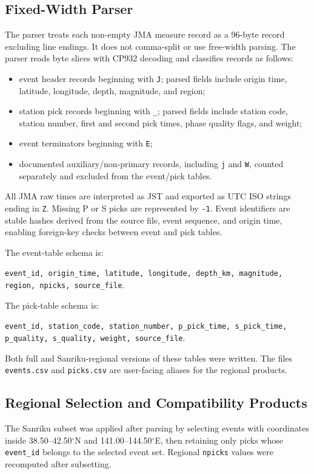 \documentclass[11pt]{article}
\begin{document}
\subsection{Fixed-Width Parser}

The parser treats each non-empty JMA measure record as a 96-byte record excluding line endings.  It does not comma-split or use free-width parsing.  The parser reads byte slices with CP932 decoding and classifies records as follows:
\begin{itemize}
  \item event header records beginning with \texttt{J}; parsed fields include origin time, latitude, longitude, depth, magnitude, and region;
  \item station pick records beginning with \texttt{\_}; parsed fields include station code, station number, first and second pick times, phase quality flags, and weight;
  \item event terminators beginning with \texttt{E};
  \item documented auxiliary/non-primary records, including \texttt{j} and \texttt{W}, counted separately and excluded from the event/pick tables.
\end{itemize}
All JMA raw times are interpreted as JST and exported as UTC ISO strings ending in \texttt{Z}.  Missing P or S picks are represented by \texttt{-1}.  Event identifiers are stable hashes derived from the source file, event sequence, and origin time, enabling foreign-key checks between event and pick tables.

The event-table schema is:
\begin{center}
\small\texttt{event\_id, origin\_time, latitude, longitude, depth\_km, magnitude, region, npicks, source\_file}.
\end{center}
The pick-table schema is:
\begin{center}
\small\texttt{event\_id, station\_code, station\_number, p\_pick\_time, s\_pick\_time, p\_quality, s\_quality, weight, source\_file}.
\end{center}
Both full and Sanriku-regional versions of these tables were written.  The files \texttt{events.csv} and \texttt{picks.csv} are user-facing aliases for the regional products.

\subsection{Regional Selection and Compatibility Products}

The Sanriku subset was applied after parsing by selecting events with coordinates inside 38.50--42.50\(^{\circ}\)N and 141.00--144.50\(^{\circ}\)E, then retaining only picks whose \texttt{event\_id} belongs to the selected event set.  Regional \texttt{npicks} values were recomputed after subsetting.
\end{document}
